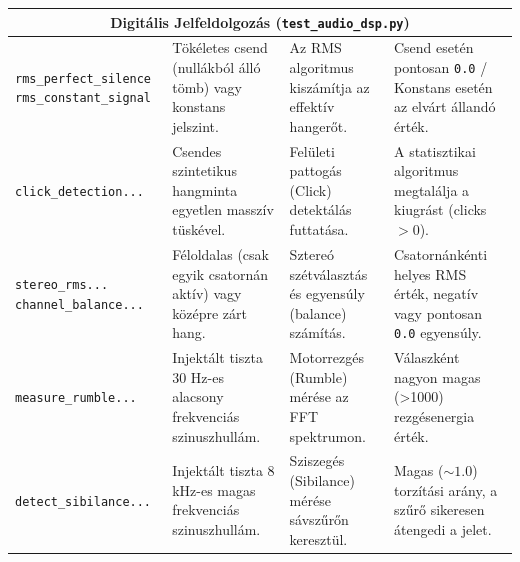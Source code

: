 \begin{longtable}{|p{3.2cm}|p{3.6cm}|p{3.2cm}|p{4cm}|}
    \multicolumn{4}{|c|}{\textbf{Digitális Jelfeldolgozás (\texttt{test\_audio\_dsp.py})}} \\ \hline
    \texttt{rms\_perfect\_silence} \newline \texttt{rms\_constant\_signal} & Tökéletes csend (nullákból álló tömb) vagy konstans jelszint. & Az RMS algoritmus kiszámítja az effektív hangerőt. & Csend esetén pontosan \texttt{0.0} / Konstans esetén az elvárt állandó érték. \\ \hline
    \texttt{click\_detection...} & Csendes szintetikus hangminta egyetlen masszív tüskével. & Felületi pattogás (Click) detektálás futtatása. & A statisztikai algoritmus megtalálja a kiugrást (clicks $>0$). \\ \hline
    \texttt{stereo\_rms...} \newline \texttt{channel\_balance...} & Féloldalas (csak egyik csatornán aktív) vagy középre zárt hang. & Sztereó szétválasztás és egyensúly (balance) számítás. & Csatornánkénti helyes RMS érték, negatív vagy pontosan \texttt{0.0} egyensúly. \\ \hline
    \texttt{measure\_rumble...} & Injektált tiszta 30 Hz-es alacsony frekvenciás szinuszhullám. & Motorrezgés (Rumble) mérése az FFT spektrumon. & Válaszként nagyon magas (>1000) rezgésenergia érték. \\ \hline
    \texttt{detect\_sibilance...} & Injektált tiszta 8 kHz-es magas frekvenciás szinuszhullám. & Sziszegés (Sibilance) mérése sávszűrőn keresztül. & Magas ($\sim 1.0$) torzítási arány, a szűrő sikeresen átengedi a jelet. \\ \hline


\end{longtable}
